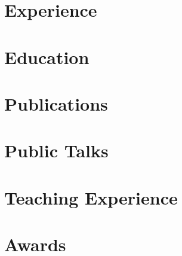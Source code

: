 \documentclass[
  oneside]{article}
\author{}
\date{}
\begin{document}


\section{Experience}\label{experience}



\section{Education}\label{education}



\section{Publications}\label{publications}



\section{Public Talks}\label{public-talks}



\section{Teaching Experience}\label{teaching-experience}



\section{Awards}\label{awards}


\end{document}
